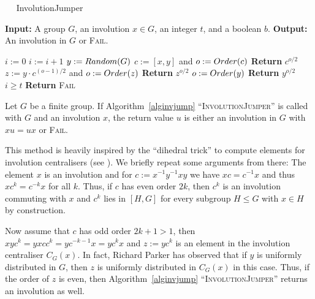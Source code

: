 \begin{algorithm}
\caption{$\quad$ \sc InvolutionJumper}
%
\label{alginvjump}
\begin{algorithmic}
\STATE \textbf{Input:} A group $G$, an involution
$x \in G$, an integer $t$, and a boolean $b$.
\STATE \textbf{Output:} An involution in $G$ or \textsc{Fail}.

\smallskip
\STATE $i := 0$
\REPEAT
    \STATE $i := i + 1$
    \STATE $y := \textsc{Random}(G)$ \hspace*{10mm} 
    \STATE $c := [x,y]$ and
    $o := \textsc{Order}(c)$
            \STATE \textbf{Return} $c^{o/2}$
            \STATE $z := y \cdot c^{(o-1)/2}$ and
            $o := \textsc{Order}(z)$
                \STATE \textbf{Return} $z^{o/2}$
            \ENDIF
        \ENDIF
        \STATE $o := \textsc{Order}(y)$
            \STATE \textbf{Return} $y^{o/2}$
        \ENDIF
    \ENDIF
\UNTIL $i \ge t$
\STATE \textbf{Return} \textsc{Fail}
\end{algorithmic}
\end{algorithm}

\begin{Prop}
%
Let $G$ be a finite group. If Algorithm~\ref{alginvjump}
``\textsc{InvolutionJumper}'' is called with $G$ and an
involution $x$, the return value $u$ is either an involution in $G$ with
$xu=ux$ or \textsc{Fail}. 
\end{Prop}
\proofbeg
This method is heavily inspired by the ``dihedral trick'' to compute
elements for involution centralisers (see \cite[2.2]{BrayInv}). We briefly
repeat some arguments from there:
The element $x$ is an
involution and for $c := x^{-1} y^{-1} x y$ we have 
$x c = c^{-1}x$ and thus
$xc^k = c^{-k}x$ for all $k$. Thus, if $c$ has even 
order $2k$, then
$c^k$ is an involution commuting with $x$ and $c^k$ lies in $[H,G]$ 
for every subgroup $H \le G$ with $x \in H$ by construction.

Now assume that $c$ has odd order $2k+1 > 1$,
then $xyc^k = yxcc^k = y c^{-k-1}x=yc^kx$ and $z := yc^k$ is an 
element in the 
involution
centraliser $C_{G}(x)$. In fact, Richard Parker has observed that
if $y$ is
uniformly distributed in $G$, then $z$ is uniformly distributed in
$C_{G}(x)$ in this case. Thus, if the order of $z$ is even,
then Algorithm~\ref{alginvjump} ``\textsc{InvolutionJumper}'' 
returns an involution as well.

